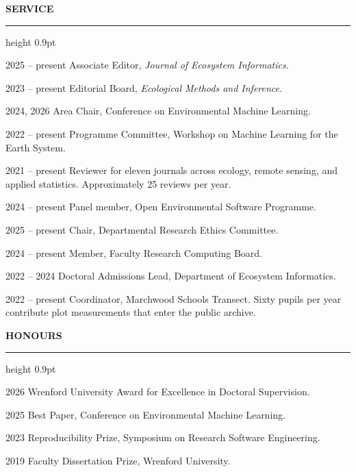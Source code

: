 \documentclass[10pt,a4paper]{article}
\newcommand{\cvsection}[1]{%
  \vspace{10pt}%
  {\normalsize\bfseries\MakeUppercase{#1}}%
  \vspace{2pt}\hrule height 0.9pt%
  \vspace{6pt}%
}
\newcommand{\cvsubsection}[1]{%
  \vspace{7pt}{\small\bfseries #1}\vspace{3pt}%
}
\newenvironment{dated}[1][2.4cm]{%
  \begin{list}{}{%
    \setlength{\labelwidth}{#1}%
    \setlength{\leftmargin}{\dimexpr#1+0.5cm\relax}%
    \setlength{\labelsep}{0.5cm}%
    \setlength{\itemsep}{4pt}%
    \setlength{\parsep}{2pt}%
    \setlength{\topsep}{2pt}%
    \renewcommand{\makelabel}[1]{\small##1\hfill}%
  }%
}{\end{list}}
\begin{document}
\cvsection{Service}

\cvsubsection{Editorial}
\begin{dated}[2.4cm]
  \item[2025 -- present] Associate Editor, \textit{Journal of Ecosystem Informatics}.
  \item[2023 -- present] Editorial Board, \textit{Ecological Methods and Inference}.
\end{dated}

\cvsubsection{Programme committees and review}
\begin{dated}[2.4cm]
  \item[2024, 2026] Area Chair, Conference on Environmental Machine Learning.
  \item[2022 -- present] Programme Committee, Workshop on Machine Learning for the Earth System.
  \item[2021 -- present] Reviewer for eleven journals across ecology, remote sensing, and applied
    statistics. Approximately 25 reviews per year.
  \item[2024 -- present] Panel member, Open Environmental Software Programme.
\end{dated}

\cvsubsection{Institutional}
\begin{dated}[2.4cm]
  \item[2025 -- present] Chair, Departmental Research Ethics Committee.
  \item[2024 -- present] Member, Faculty Research Computing Board.
  \item[2022 -- 2024] Doctoral Admissions Lead, Department of Ecosystem Informatics.
\end{dated}

\cvsubsection{Outreach}
\begin{dated}[2.4cm]
  \item[2022 -- present] Coordinator, Marchwood Schools Transect. Sixty pupils per year contribute
    plot measurements that enter the public archive.
\end{dated}

\cvsection{Honours}

\begin{dated}[2.4cm]
  \item[2026] Wrenford University Award for Excellence in Doctoral Supervision.
  \item[2025] Best Paper, Conference on Environmental Machine Learning.
  \item[2023] Reproducibility Prize, Symposium on Research Software Engineering.
  \item[2019] Faculty Dissertation Prize, Wrenford University.
\end{dated}
\end{document}
